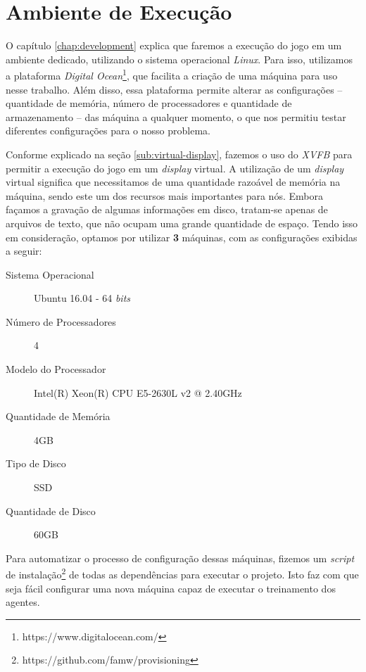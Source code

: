 
\section{\label{section:environment}Ambiente de Execução}

O capítulo \ref{chap:development} explica que faremos a execução do jogo em um
ambiente dedicado, utilizando o sistema operacional \textit{Linux}. Para isso,
utilizamos a plataforma \textit{Digital
Ocean}\footnote{https://www.digitalocean.com/}, que facilita a criação de uma
máquina para uso nesse trabalho. Além disso, essa plataforma permite alterar as
configurações -- quantidade de memória, número de processadores e quantidade de
armazenamento -- das máquina a qualquer momento, o que nos permitiu testar
diferentes configurações para o nosso problema.

Conforme explicado na seção \ref{sub:virtual-display}, fazemos o uso do
\textit{XVFB} para permitir a execução do jogo em um \textit{display} virtual. A
utilização de um \textit{display} virtual significa que necessitamos de uma
quantidade razoável de memória na máquina, sendo este um dos recursos mais
importantes para nós. Embora façamos a gravação de algumas informações em disco,
tratam-se apenas de arquivos de texto, que não ocupam uma grande quantidade de
espaço. Tendo isso em consideração, optamos por utilizar \textbf{3} máquinas,
com as configurações exibidas a seguir:

\begin{description}
    \item [Sistema Operacional] Ubuntu 16.04 - 64 \textit{bits}
    \item [Número de Processadores] 4
    \item [Modelo do Processador] Intel(R) Xeon(R) CPU E5-2630L v2 @ 2.40GHz
    \item [Quantidade de Memória] 4GB
    \item [Tipo de Disco] SSD
    \item [Quantidade de Disco] 60GB
\end{description}

Para automatizar o processo de configuração dessas máquinas, fizemos um
\textit{script} de instalação\footnote{https://github.com/famw/provisioning} de
todas as dependências para executar o projeto. Isto faz com que seja fácil
configurar uma nova máquina capaz de executar o treinamento dos agentes.

